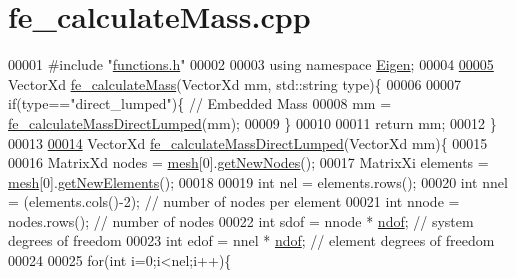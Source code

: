 \hypertarget{fe__calculate_mass_8cpp_source}{}\section{fe\+\_\+calculate\+Mass.\+cpp}
\label{fe__calculate_mass_8cpp_source}

\begin{DoxyCode}
00001 \textcolor{preprocessor}{#include "\hyperlink{functions_8h}{functions.h}"}
00002 
00003 \textcolor{keyword}{using namespace }\hyperlink{namespace_eigen}{Eigen};
00004 
\hyperlink{fe__calculate_mass_8cpp_abeed10bd80ae1f3c95d79c4aed512d8f}{00005} VectorXd \hyperlink{fe__calculate_mass_8cpp_abeed10bd80ae1f3c95d79c4aed512d8f}{fe\_calculateMass}(VectorXd mm, std::string type)\{
00006 
00007     \textcolor{keywordflow}{if}(type==\textcolor{stringliteral}{"direct\_lumped"})\{ \textcolor{comment}{// Embedded Mass}
00008       mm = \hyperlink{fe__calculate_mass_8cpp_aca6d101baf8887cf61064067985cbd62}{fe\_calculateMassDirectLumped}(mm);
00009     \}
00010 
00011   \textcolor{keywordflow}{return} mm;
00012 \}
00013 
\hyperlink{fe__calculate_mass_8cpp_aca6d101baf8887cf61064067985cbd62}{00014} VectorXd \hyperlink{fe__calculate_mass_8cpp_aca6d101baf8887cf61064067985cbd62}{fe\_calculateMassDirectLumped}(VectorXd mm)\{
00015 
00016   MatrixXd nodes = \hyperlink{_global_variables_8h_a6e08f89b32254fb4b129720418e7c6ea}{mesh}[0].\hyperlink{class_mesh_a52ecce406bbef80cbf3610db3ea5ea40}{getNewNodes}();
00017   MatrixXi elements = \hyperlink{_global_variables_8h_a6e08f89b32254fb4b129720418e7c6ea}{mesh}[0].\hyperlink{class_mesh_a6e425e9499e64ab52c4555aa3763651d}{getNewElements}();
00018 
00019   \textcolor{keywordtype}{int} nel = elements.rows(); 
00020   \textcolor{keywordtype}{int} nnel = (elements.cols()-2); \textcolor{comment}{// number of nodes per element}
00021   \textcolor{keywordtype}{int} nnode = nodes.rows(); \textcolor{comment}{// number of nodes}
00022   \textcolor{keywordtype}{int} sdof = nnode * \hyperlink{_global_variables_8h_aa789fe4d8a13fd0990b630909430d5d0}{ndof}; \textcolor{comment}{// system degrees of freedom}
00023   \textcolor{keywordtype}{int} edof = nnel * \hyperlink{_global_variables_8h_aa789fe4d8a13fd0990b630909430d5d0}{ndof}; \textcolor{comment}{// element degrees of freedom}
00024 
00025   \textcolor{keywordflow}{for}(\textcolor{keywordtype}{int} i=0;i<nel;i++)\{

\end{DoxyCode}
